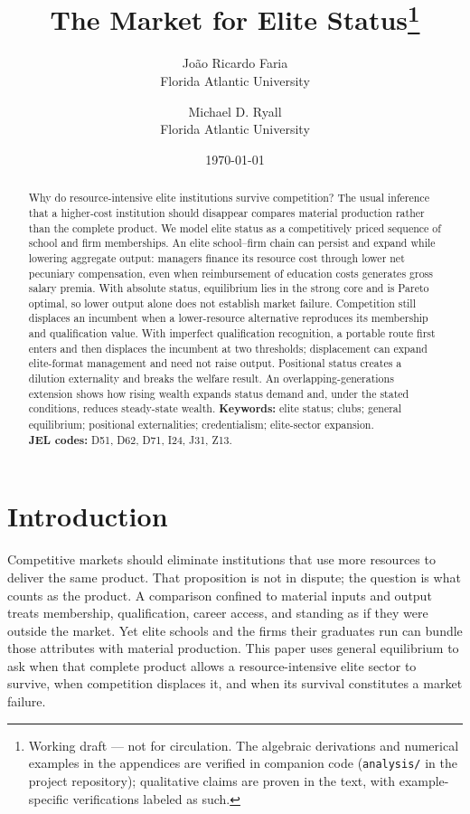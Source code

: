 \documentclass[12pt,letterpaper]{article}
\title{The Market for Elite Status\thanks{Working draft --- not for circulation.
The algebraic derivations and numerical examples in the appendices are verified in companion code (\texttt{analysis/} in the project repository); qualitative claims are proven in the text, with example-specific verifications labeled as such.}}
\author{Jo\~{a}o Ricardo Faria\\ Florida Atlantic University
  \and Michael D. Ryall\\ Florida Atlantic University}
\date{\today}
\theoremstyle{definition}
\begin{document}
\maketitle

\begin{abstract}
\noindent Why do resource-intensive elite institutions survive competition?
The usual inference that a higher-cost institution should disappear compares material
production rather than the complete product.
We model elite status as a competitively priced sequence of school and firm memberships.
An elite school--firm chain can persist and expand while lowering aggregate output:
managers finance its resource cost through lower net pecuniary compensation, even when
reimbursement of education costs generates gross salary premia.
With absolute status, equilibrium lies in the strong core and is Pareto optimal, so lower
output alone does not establish market failure.
Competition still displaces an incumbent when a lower-resource alternative reproduces
its membership and qualification value.
With imperfect qualification recognition, a portable route first enters and then
displaces the incumbent at two thresholds; displacement can expand elite-format
management and need not raise output.
Positional status creates a dilution externality and breaks the welfare result.
An overlapping-generations extension shows how rising wealth expands status demand and,
under the stated conditions, reduces steady-state wealth.
\medskip
\noindent\textbf{Keywords:} elite status; clubs; general equilibrium; positional externalities; credentialism; elite-sector expansion.\\
\textbf{JEL codes:} D51, D62, D71, I24, J31, Z13.
\end{abstract}

\onehalfspacing

\section{Introduction}\label{sec:intro}

Competitive markets should eliminate institutions that use more resources to deliver the
same product.
That proposition is not in dispute; the question is what counts as the product.
A comparison confined to material inputs and output treats membership, qualification,
career access, and standing as if they were outside the market.
Yet elite schools and the firms their graduates run can bundle those attributes with
material production.
This paper uses general equilibrium to ask when that complete product allows a
resource-intensive elite sector to survive, when competition displaces it, and when its
survival constitutes a market failure.
\end{document}
